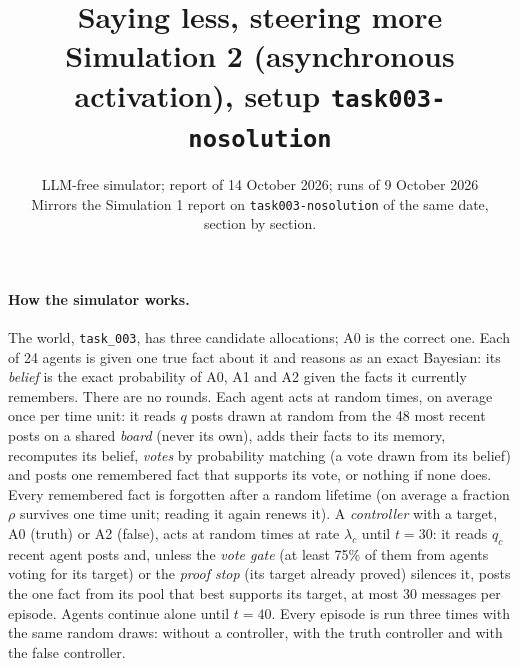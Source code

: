 \documentclass[10pt,a4paper]{article}
\title{\vspace{-1.2cm}\textbf{Saying less, steering more}\\[2pt]
\large Simulation 2 (asynchronous activation), setup \texttt{task003-nosolution}}
\author{LLM-free simulator; report of 14 October 2026; runs of 9 October 2026\\
\small Mirrors the Simulation 1 report on \texttt{task003-nosolution} of the same date, section by section.}
\date{}
\begin{document}
\maketitle
\vspace{-1cm}

\paragraph{How the simulator works.} The world, \texttt{task\_003}, has three candidate
allocations; A0 is the correct one. Each of 24 agents is given one true fact about it and reasons as
an exact Bayesian: its \emph{belief} is the exact probability of A0, A1 and A2 given the facts it
currently remembers. There are no rounds. Each agent acts at random times, on average once per time
unit: it reads $q$ posts drawn at random from the 48 most recent posts on a shared \emph{board}
(never its own), adds their facts to its memory, recomputes its belief, \emph{votes} by probability
matching (a vote drawn from its belief) and posts one remembered fact that supports its vote, or
nothing if none does. Every remembered fact is forgotten after a random lifetime (on average a
fraction $\rho$ survives one time unit; reading it again renews it). A \emph{controller} with a
target, A0 (truth) or A2 (false), acts at random times at rate $\lambda_c$ until $t = 30$: it reads
$q_c$ recent agent posts and, unless the \emph{vote gate} (at least 75\% of them from agents voting
for its target) or the \emph{proof stop} (its target already proved) silences it, posts the one fact
from its pool that best supports its target, at most 30 messages per episode. Agents continue alone
until $t = 40$. Every episode is run three times with the same random draws: without a controller,
with the truth controller and with the false controller.
\end{document}
